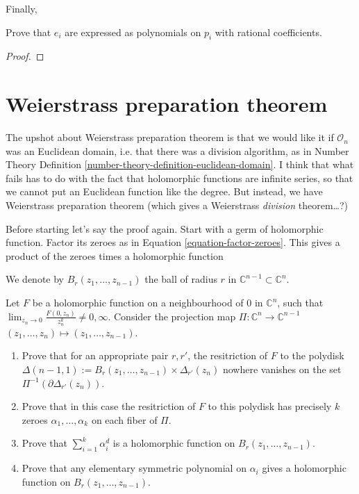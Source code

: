 \noindent
Finally,

\begin{exercise}
\label{exercise-symmetric-polynomials-in-terms-of-Newton-polynomials}
Prove that $e_i$ are expressed as polynomials on $p_i$ with rational
coefficients.
\end{exercise}

\begin{proof}

\end{proof}

\section{Weierstrass preparation theorem}
\label{section-weierstrass-preparation-theorem}

\noindent
The upshot about Weierstrass preparation theorem is that
we would like it if $\mathcal{O}_n$ was an Euclidean domain,
i.e. that there was a division algorithm, 
as in Number Theory Definition \ref{number-theory-definition-euclidean-domain}.
I think that what fails has to do with the fact
that holomorphic functions are infinite series,
so that we cannot put an Euclidean function like the degree.
But instead, we have Weierstrass preparation theorem
(which gives a Weierstrass {\it division} theorem…?)

Before starting let's say the proof again.
Start with a germ of holomorphic function.
Factor its zeroes as in Equation \ref{equation-factor-zeroes}.
This gives a product of the zeroes times a holomorphic function

We denote by $B_r(z_1,\ldots,z_{n-1})$ the ball of radius $r$ in
$\mathbb{C}^{n-1}\subset\mathbb{C}^n$.

\begin{exercise}
\label{exercise-polydisks}
Let $F$ be a holomorphic function on a neighbourhood of $0$ in $\mathbb{C}^n$,
such that $\lim_{z_n\to 0} \frac{F(0,z_n)}{z_n^k}\neq 0,\infty$.
Consider the projection map $\Pi:\mathbb{C}^n\to\mathbb{C}^{n-1}$ 
$(z_1,\ldots,z_n)\mapsto (z_1,\ldots,z_{n-1})$.
\begin{enumerate}
\item Prove that for an appropriate pair $r,r'$, the resitriction of $F$ to the
polydisk $\Delta(n-1,1):=B_r(z_1,\ldots,z_{n-1})\times\Delta_{r'}(z_n)$ nowhere
vanishes on the set $\Pi^{-1}(\partial\Delta_{r'}(z_n))$.
\item Prove that in this case the resitriction of $F$ to this polydisk has
precisely $k$ zeroes $\alpha_1,\ldots,\alpha_k$ on each fiber of $\Pi$.
\item Prove that $\sum_{i=1}^k \alpha_i^d$ is a holomorphic function on
$B_r(z_1,\ldots,z_{n-1})$.
\item Prove that any elementary symmetric polynomial on $\alpha_i$ gives a
holomorphic function on $B_r(z_1,\ldots,z_{n-1})$.
\end{enumerate}
\end{exercise}

